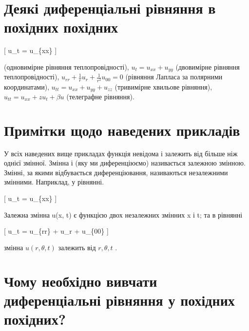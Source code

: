 \documentclass[
  ukrainian,
]{article}
\begin{document}
\section{Деякі диференціальні рівняння в похідних
похідних}\label{ux434ux435ux44fux43aux456-ux434ux438ux444ux435ux440ux435ux43dux446ux456ux430ux43bux44cux43dux456-ux440ux456ux432ux43dux44fux43dux43dux44f-ux432-ux43fux43eux445ux456ux434ux43dux438ux445-ux43fux43eux445ux456ux434ux43dux438ux445}

{[} u\_t = u\_\{xx\} {]}

(одновимірне рівняння теплопровідності), \(u_t = u_{xx} + u_{yy}\)
(двовимірне рівняння теплопровідності),
\(u_{rr} + \frac{1}{r}u_r + \frac{1}{r^2}u_{00} = 0\) (рівняння Лапласа
за полярними координатами), \(u_{tt} = u_{xx} + u_{yy} + u_{zz}\)
(тривимірне хвильове рівняння), \(u_{tt} = u_{xx} + zu_t + \beta u\)
(телеграфне рівняння).

\section{Примітки щодо наведених
прикладів}\label{ux43fux440ux438ux43cux456ux442ux43aux438-ux449ux43eux434ux43e-ux43dux430ux432ux435ux434ux435ux43dux438ux445-ux43fux440ux438ux43aux43bux430ux434ux456ux432}

У всіх наведених вище прикладах функція невідома і залежить від більше
ніж однієї змінної. Змінна і (яку ми диференціюємо) називається залежною
змінною. Змінні, за якими відбувається диференціювання, називаються
незалежними змінними. Наприклад, у рівнянні.

{[} u\_t = u\_\{xx\} {]}

Залежна змінна u(x, t) є функцією двох незалежних змінних x і t; та в
рівнянні

{[} u\_t = u\_\{rr\} +  u\_r +  u\_\{00\} {]}

змінна \(u(r, \theta, t)\) залежить від \(r, \theta, t\) .

\section{Чому необхідно вивчати диференціальні рівняння у похідних
похідних?}\label{ux447ux43eux43cux443-ux43dux435ux43eux431ux445ux456ux434ux43dux43e-ux432ux438ux432ux447ux430ux442ux438-ux434ux438ux444ux435ux440ux435ux43dux446ux456ux430ux43bux44cux43dux456-ux440ux456ux432ux43dux44fux43dux43dux44f-ux443-ux43fux43eux445ux456ux434ux43dux438ux445-ux43fux43eux445ux456ux434ux43dux438ux445}
\end{document}
